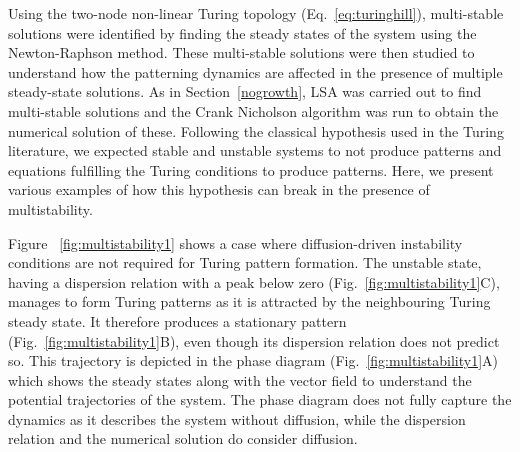 Using the two-node non-linear Turing topology (Eq.~\ref{eq:turinghill}), multi-stable solutions were identified by finding the steady states of the system using the Newton-Raphson method. These multi-stable solutions were then studied to understand how the patterning dynamics are affected in the presence of multiple steady-state solutions.
As in Section~\ref{nogrowth}, LSA was carried out to find multi-stable solutions and the Crank Nicholson algorithm was run to obtain the numerical solution of these.
Following the classical hypothesis used in the Turing literature, we expected stable and unstable systems to not produce patterns and equations fulfilling the Turing conditions to produce patterns.
Here, we present various examples of how this hypothesis can break in the presence of multistability.

Figure ~\ref{fig:multistability1} shows a case where diffusion-driven instability conditions are not required for Turing pattern formation.
The unstable state, having a dispersion relation with a peak below zero (Fig.~\ref{fig:multistability1}C), manages to form Turing patterns as it is attracted by the neighbouring Turing steady state.
It therefore produces a stationary pattern (Fig.~\ref{fig:multistability1}B), even though its dispersion relation does not predict so.
This trajectory is depicted in the phase diagram (Fig.~\ref{fig:multistability1}A) which shows the steady states along with the vector field to understand the potential trajectories of the system.
The phase diagram does not fully capture the dynamics as it describes the system without diffusion, while the dispersion relation and the numerical solution do consider diffusion.

